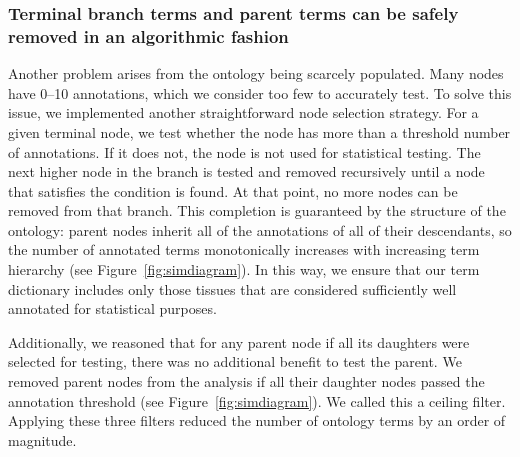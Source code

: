 \subsubsection*{Terminal branch terms and parent terms can be
safely removed in an algorithmic fashion }
Another problem arises from the ontology being scarcely populated. Many nodes
have 0--10 annotations, which we consider too few to accurately test. To solve
this issue, we implemented another straightforward node selection strategy. For
a given terminal node, we test whether the node has more than a threshold number
of annotations. If it does not, the node is not used for statistical testing.
The next higher node in the branch is tested and removed recursively until a
node that satisfies the condition is found. At that point, no more nodes can be
removed from that branch. This completion is guaranteed by the structure of the
ontology: parent nodes inherit all of the annotations of all of their
descendants, so the number of annotated terms monotonically increases with
increasing term hierarchy (see Figure~\ref{fig:simdiagram}). In this way, we
ensure that our term dictionary includes only those tissues that are considered
sufficiently well annotated for statistical purposes.

Additionally, we reasoned that for any parent node if all its daughters were
selected for testing, there was no additional benefit to test the parent. We
removed parent nodes from the analysis if all their daughter nodes passed the
annotation threshold (see Figure~\ref{fig:simdiagram}). We called this a ceiling
filter. Applying these three filters reduced the number of ontology terms by an
order of magnitude.


